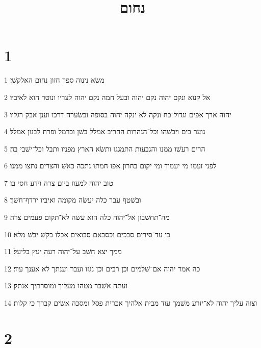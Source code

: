 

\title{נחום}


\chapter{1}

\par 1 משׂא נינוה ספר חזון נחום האלקשׁי׃
\par 2 אל קנוא ונקם יהוה נקם יהוה ובעל חמה נקם יהוה לצריו ונוטר הוא לאיביו׃
\par 3 יהוה ארך אפים וגדול־כח ונקה לא ינקה יהוה בסופה ובשׂערה דרכו וענן אבק רגליו׃
\par 4 גוער בים ויבשׁהו וכל־הנהרות החריב אמלל בשׁן וכרמל ופרח לבנון אמלל׃
\par 5 הרים רעשׁו ממנו והגבעות התמגגו ותשׂא הארץ מפניו ותבל וכל־ישׁבי בה׃
\par 6 לפני זעמו מי יעמוד ומי יקום בחרון אפו חמתו נתכה כאשׁ והצרים נתצו ממנו׃
\par 7 טוב יהוה למעוז ביום צרה וידע חסי בו׃
\par 8 ובשׁטף עבר כלה יעשׂה מקומה ואיביו ירדף־חשׁך׃
\par 9 מה־תחשׁבון אל־יהוה כלה הוא עשׂה לא־תקום פעמים צרה׃
\par 10 כי עד־סירים סבכים וכסבאם סבואים אכלו כקשׁ יבשׁ מלא׃
\par 11 ממך יצא חשׁב על־יהוה רעה יעץ בליעל׃
\par 12 כה אמר יהוה אם־שׁלמים וכן רבים וכן נגזו ועבר וענתך לא אענך עוד׃
\par 13 ועתה אשׁבר מטהו מעליך ומוסרתיך אנתק׃
\par 14 וצוה עליך יהוה לא־יזרע משׁמך עוד מבית אלהיך אכרית פסל ומסכה אשׂים קברך כי קלות׃

\chapter{2}

